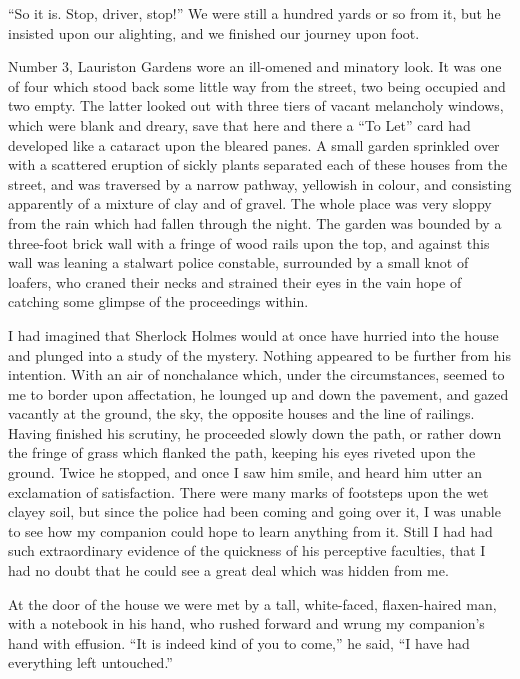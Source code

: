 \documentclass[12pt,english,oneside]{book}
\begin{document}
{}``So it is. Stop, driver, stop!'' We were still a hundred yards
or so from it, but he insisted upon our alighting, and we finished
our journey upon foot.

Number 3, Lauriston Gardens wore an ill-omened and minatory look.
It was one of four which stood back some little way from the street,
two being occupied and two empty. The latter looked out with three
tiers of vacant melancholy windows, which were blank and dreary, save
that here and there a {}``To Let'' card had developed like a cataract
upon the bleared panes. A small garden sprinkled over with a scattered
eruption of sickly plants separated each of these houses from the
street, and was traversed by a narrow pathway, yellowish in colour,
and consisting apparently of a mixture of clay and of gravel. The
whole place was very sloppy from the rain which had fallen through
the night. The garden was bounded by a three-foot brick wall with
a fringe of wood rails upon the top, and against this wall was leaning
a stalwart police constable, surrounded by a small knot of loafers,
who craned their necks and strained their eyes in the vain hope of
catching some glimpse of the proceedings within.

I had imagined that Sherlock Holmes would at once have hurried into
the house and plunged into a study of the mystery. Nothing appeared
to be further from his intention. With an air of nonchalance which,
under the circumstances, seemed to me to border upon affectation,
he lounged up and down the pavement, and gazed vacantly at the ground,
the sky, the opposite houses and the line of railings. Having finished
his scrutiny, he proceeded slowly down the path, or rather down the
fringe of grass which flanked the path, keeping his eyes riveted upon
the ground. Twice he stopped, and once I saw him smile, and heard
him utter an exclamation of satisfaction. There were many marks of
footsteps upon the wet clayey soil, but since the police had been
coming and going over it, I was unable to see how my companion could
hope to learn anything from it. Still I had had such extraordinary
evidence of the quickness of his perceptive faculties, that I had
no doubt that he could see a great deal which was hidden from me.

At the door of the house we were met by a tall, white-faced, flaxen-haired
man, with a notebook in his hand, who rushed forward and wrung my
companion's hand with effusion. {}``It is indeed kind of you to come,''
he said, {}``I have had everything left untouched.''
\end{document}
